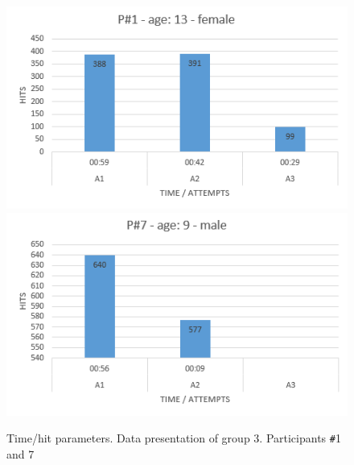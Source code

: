 \begin{figure}[!ht]
    \centering
    \includegraphics[width=.6\textwidth]{figures/p1.png}
    \includegraphics[width=.6\textwidth]{figures/p7.png}
    \caption{Time/hit parameters. Data presentation of group 3. Participants \texttt{\#}1 and 7}

    \label{fig:agegroup3}
\end{figure}





